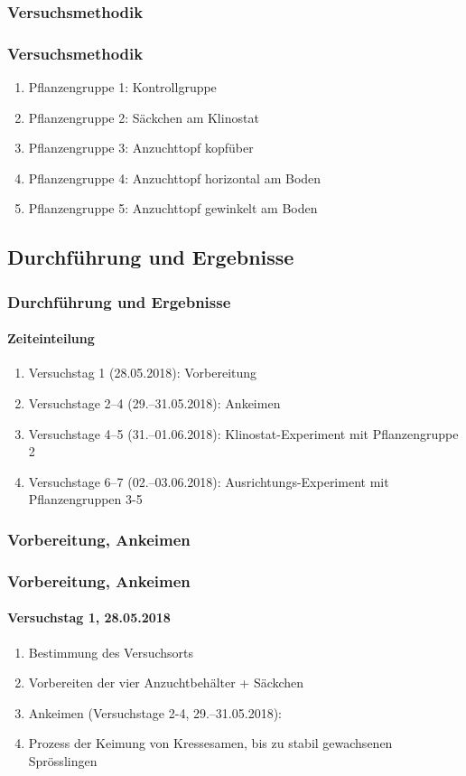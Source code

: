 \documentclass[aspectratio=169
]{beamer}
\begin{document}
	\subsubsection{Versuchsmethodik}
	
	\begin{frame}[<+(1)->]
		\frametitle{Versuchsmethodik}
\begin{enumerate}
\item Pflanzengruppe 1: Kontrollgruppe
\item Pflanzengruppe 2: Säckchen am Klinostat
\item Pflanzengruppe 3: Anzuchttopf kopfüber
\item Pflanzengruppe 4: Anzuchttopf horizontal am Boden
\item Pflanzengruppe 5: Anzuchttopf gewinkelt am Boden 
\end{enumerate}
		
	\end{frame}
	
\subsection{Durchführung und Ergebnisse}
	
\begin{frame}[<+(1)->]
\frametitle{Durchführung und Ergebnisse}
\framesubtitle{Zeiteinteilung}
		
\begin{enumerate}
\item Versuchstag 1 (28.05.2018): Vorbereitung
\item Versuchstage 2–4 (29.–31.05.2018): Ankeimen
\item Versuchstage 4–5 (31.–01.06.2018): Klinostat-Experiment mit Pflanzengruppe 2
\item Versuchstage 6–7 (02.–03.06.2018): Ausrichtungs-Experiment mit Pflanzengruppen 3-5
\end{enumerate}
\end{frame}
	
\subsubsection{Vorbereitung, Ankeimen}

\begin{frame}[<+(1)->]
\frametitle{Vorbereitung, Ankeimen}
\framesubtitle{Versuchstag 1, 28.05.2018}
		
\begin{enumerate}
\item Bestimmung des Versuchsorts
\item Vorbereiten der vier Anzuchtbehälter + Säckchen 
\item Ankeimen (Versuchstage 2-4, 29.–31.05.2018):
\item Prozess der Keimung von Kressesamen, bis zu stabil gewachsenen Sprösslingen
\end{enumerate}
\end{frame}
	
\end{document}
